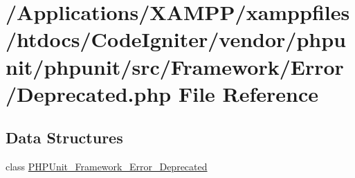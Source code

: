 \hypertarget{phpunit_2phpunit_2src_2_framework_2_error_2_deprecated_8php}{}\section{/\+Applications/\+X\+A\+M\+P\+P/xamppfiles/htdocs/\+Code\+Igniter/vendor/phpunit/phpunit/src/\+Framework/\+Error/\+Deprecated.php File Reference}
\label{phpunit_2phpunit_2src_2_framework_2_error_2_deprecated_8php}
\subsection*{Data Structures}
\begin{DoxyCompactItemize}
\item 
class \mbox{\hyperlink{class_p_h_p_unit___framework___error___deprecated}{P\+H\+P\+Unit\+\_\+\+Framework\+\_\+\+Error\+\_\+\+Deprecated}}
\end{DoxyCompactItemize}
